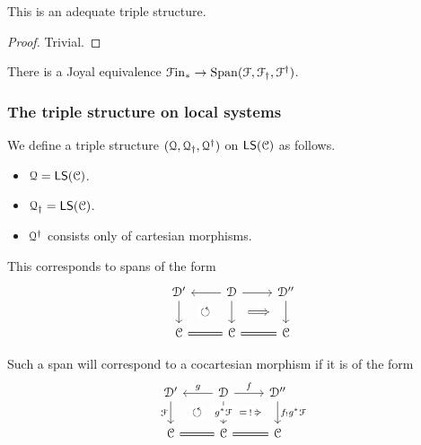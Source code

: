 \documentclass[main.tex]{subfiles}
\begin{document}
\begin{proposition}
  This is an adequate triple structure.
\end{proposition}
\begin{proof}
  Trivial.
\end{proof}

\begin{proposition}
  There is a Joyal equivalence $\mathcal{F}\mathrm{in}_{*} \to \mathrm{Span}(\mathcal{F}, \mathcal{F}_{\dagger}, \mathcal{F}^{\dagger})$.
\end{proposition}

\subsubsection{The triple structure on local systems}
\label{sss:the_triple_structure_on_local_systems}

We define a triple structure $(\mathcal{Q}, \mathcal{Q}_{\dagger}, \mathcal{Q}^{\dagger})$ on $\mathsf{LS}(\mathcal{C})$ as follows.
\begin{itemize}
  \item $\mathcal{Q} = \mathsf{LS}(\mathcal{C})$.

  \item $\mathcal{Q}_{\dagger} = \mathsf{LS}(\mathcal{C})$.

  \item $\mathcal{Q}^{\dagger}$ consists only of cartesian morphisms.
\end{itemize}

This corresponds to spans of the form
\begin{equation*}
  \begin{tikzcd}
    \category{D}'
    \arrow[d, ""{name=L, right}]
    & \category{D}
    \arrow[d, ""{name=ML, left}, ""{name=MR, right}]
    \arrow[l, swap]
    \arrow[r]
    & \category{D}''
    \arrow[d, ""{name=R, left}]
    \\
    \category{C}
    \arrow[r, equals]
    &\category{C}
    & \category{C}
    \arrow[l, equals]
    \arrow[Rightarrow, from=MR, to=R, shorten=2ex]
    \arrow[Rightarrow, from=ML, to=L, phantom, "\circlearrowleft"{description}]
  \end{tikzcd}
\end{equation*}

Such a span will correspond to a cocartesian morphism if it is of the form
\begin{equation*}
  \begin{tikzcd}
    \category{D}'
    \arrow[d, "\mathcal{F}"{left}, ""{name=L, right}]
    & \category{D}
    \arrow[d, "g^{*}\mathcal{F}"{description}, ""{name=ML, left}, ""{name=MR, right}]
    \arrow[l, swap, "g"]
    \arrow[r, "f"]
    & \category{D}''
    \arrow[d, ""{name=R, left}, "f_{!}g^{*}\mathcal{F}"{right}]
    \\
    \category{C}
    \arrow[r, equals]
    &\category{C}
    & \category{C}
    \arrow[l, equals]
    \arrow[Rightarrow, from=MR, to=R, shorten=2ex, "!"{description}]
    \arrow[from=ML, to=L, phantom, "\circlearrowleft"{description}]
  \end{tikzcd}
\end{equation*}
\end{document}
